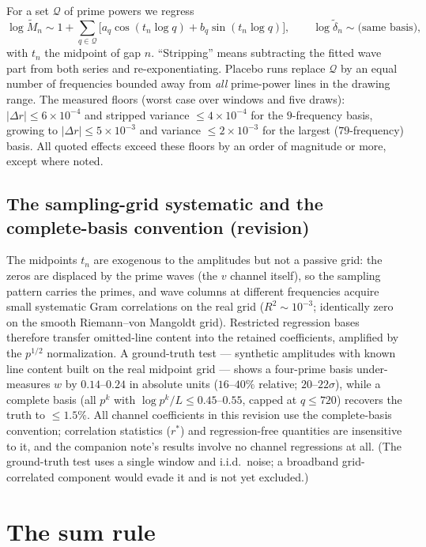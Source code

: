 \documentclass[12pt]{amsart}
\begin{document}
For a set $\mathcal{Q}$ of prime powers we regress
\[
\log \tilde M_n \sim 1 + \sum_{q \in \mathcal{Q}}
\big[ a_q \cos(t_n \log q) + b_q \sin(t_n \log q) \big],
\qquad
\log \tilde\delta_n \sim \text{(same basis)},
\]
with $t_n$ the midpoint of gap $n$. ``Stripping'' means subtracting the
fitted wave part from both series and re-exponentiating. Placebo runs
replace $\mathcal{Q}$ by an equal number of frequencies bounded away from
\emph{all} prime-power lines in the drawing range. The measured floors
(worst case over windows and five draws): $|\Delta r| \le 6\times10^{-4}$
and stripped variance $\le 4\times10^{-4}$ for the $9$-frequency basis,
growing to $|\Delta r| \le 5\times10^{-3}$ and variance
$\le 2\times10^{-3}$ for the largest ($79$-frequency) basis. All quoted
effects exceed these floors by an order of magnitude or more, except where
noted.

\subsection*{The sampling-grid systematic and the complete-basis
convention (revision)}
The midpoints $t_n$ are exogenous to the amplitudes but not a passive
grid: the zeros are displaced by the prime waves (the $v$ channel
itself), so the sampling pattern carries the primes, and wave columns at
different frequencies acquire small systematic Gram correlations on the
real grid ($R^2 \sim 10^{-3}$; identically zero on the smooth
Riemann--von Mangoldt grid). Restricted regression bases therefore
transfer omitted-line content into the retained coefficients, amplified
by the $p^{1/2}$ normalization. A ground-truth test --- synthetic
amplitudes with known line content built on the real midpoint grid ---
shows a four-prime basis under-measures $w$ by $0.14$--$0.24$ in
absolute units ($16$--$40\%$ relative; $20$--$22\sigma$), while a
complete basis (all $p^k$ with $\log p^k / L \le 0.45$--$0.55$, capped
at $q \le 720$) recovers the truth to $\le 1.5\%$. All channel coefficients in this revision use the
complete-basis convention; correlation statistics ($r^*$) and
regression-free quantities are insensitive to it, and the companion
note's results involve no channel regressions at all. (The ground-truth
test uses a single window and i.i.d.\ noise; a broadband
grid-correlated component would evade it and is not yet excluded.)

\section{The sum rule}
\end{document}
